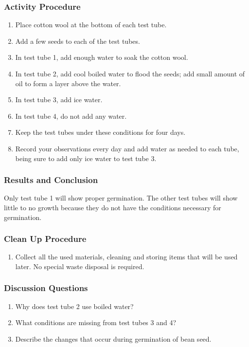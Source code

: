 \subsubsection*{Activity Procedure}
\begin{enumerate}
\item{Place cotton wool at the bottom of each test tube.}
\item{Add a few seeds to each of the test tubes.}
\item{In test tube 1, add enough water to soak the cotton wool.}
\item{In test tube 2, add cool boiled water to flood the seeds; add small amount of oil to form a layer above the water.}
\item{In test tube 3, add ice water.}
\item{In test tube 4, do not add any water.}
\item{Keep the test tubes under these conditions for four days.}
\item{Record your observations every day and add water as needed to each tube, being sure to add only ice water to test tube 3.}
\end{enumerate}

\subsubsection*{Results and Conclusion}
Only test tube 1 will show proper germination. The other test tubes will show little to no growth because they do not have the conditions necessary for germination.

\subsubsection*{Clean Up Procedure}
\begin{enumerate}
\item{Collect all the used materials, cleaning and storing items that will be used later. No special waste disposal is required.}
\end{enumerate}

\subsubsection*{Discussion Questions}
\begin{enumerate}
\item{Why does test tube 2 use boiled water?}
\item{What conditions are missing from test tubes 3 and 4?}
\item{Describe the changes that occur during germination of bean seed.}
\end{enumerate}

